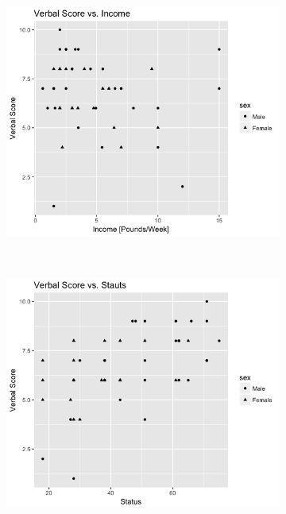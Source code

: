 \documentclass{exam}
\begin{document}
\pagebreak
\begin{figure}[t!]
	\begin{subfigure}
		\centering
		\includegraphics[scale=0.7]{Verbal_V_income}
	\end{subfigure}
	~
	\begin{subfigure}
		\centering
		\includegraphics[scale=0.7]{Verbal_V_status}
	\end{subfigure}
	
\end{figure}
\end{document}
